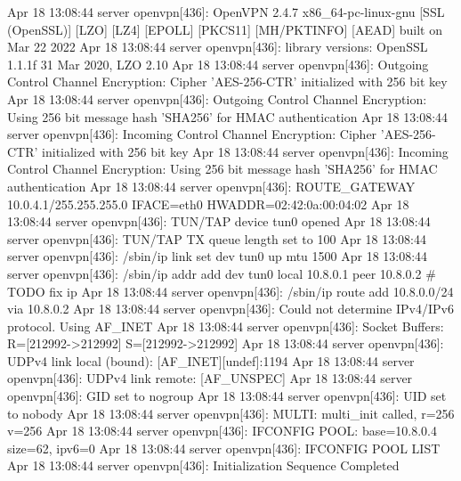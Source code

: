 \begin{bashcode}
Apr 18 13:08:44 server openvpn[436]: OpenVPN 2.4.7 x86_64-pc-linux-gnu [SSL (OpenSSL)] [LZO] [LZ4] [EPOLL] [PKCS11] [MH/PKTINFO] [AEAD] built on Mar 22 2022
Apr 18 13:08:44 server openvpn[436]: library versions: OpenSSL 1.1.1f  31 Mar 2020, LZO 2.10
Apr 18 13:08:44 server openvpn[436]: Outgoing Control Channel Encryption: Cipher 'AES-256-CTR' initialized with 256 bit key
Apr 18 13:08:44 server openvpn[436]: Outgoing Control Channel Encryption: Using 256 bit message hash 'SHA256' for HMAC authentication
Apr 18 13:08:44 server openvpn[436]: Incoming Control Channel Encryption: Cipher 'AES-256-CTR' initialized with 256 bit key
Apr 18 13:08:44 server openvpn[436]: Incoming Control Channel Encryption: Using 256 bit message hash 'SHA256' for HMAC authentication
Apr 18 13:08:44 server openvpn[436]: ROUTE_GATEWAY 10.0.4.1/255.255.255.0 IFACE=eth0 HWADDR=02:42:0a:00:04:02
Apr 18 13:08:44 server openvpn[436]: TUN/TAP device tun0 opened
Apr 18 13:08:44 server openvpn[436]: TUN/TAP TX queue length set to 100
Apr 18 13:08:44 server openvpn[436]: /sbin/ip link set dev tun0 up mtu 1500
Apr 18 13:08:44 server openvpn[436]: /sbin/ip addr add dev tun0 local 10.8.0.1 peer 10.8.0.2 # TODO fix ip
Apr 18 13:08:44 server openvpn[436]: /sbin/ip route add 10.8.0.0/24 via 10.8.0.2
Apr 18 13:08:44 server openvpn[436]: Could not determine IPv4/IPv6 protocol. Using AF_INET
Apr 18 13:08:44 server openvpn[436]: Socket Buffers: R=[212992->212992] S=[212992->212992]
Apr 18 13:08:44 server openvpn[436]: UDPv4 link local (bound): [AF_INET][undef]:1194
Apr 18 13:08:44 server openvpn[436]: UDPv4 link remote: [AF_UNSPEC]
Apr 18 13:08:44 server openvpn[436]: GID set to nogroup
Apr 18 13:08:44 server openvpn[436]: UID set to nobody
Apr 18 13:08:44 server openvpn[436]: MULTI: multi_init called, r=256 v=256
Apr 18 13:08:44 server openvpn[436]: IFCONFIG POOL: base=10.8.0.4 size=62, ipv6=0
Apr 18 13:08:44 server openvpn[436]: IFCONFIG POOL LIST
Apr 18 13:08:44 server openvpn[436]: Initialization Sequence Completed
\end{bashcode}



